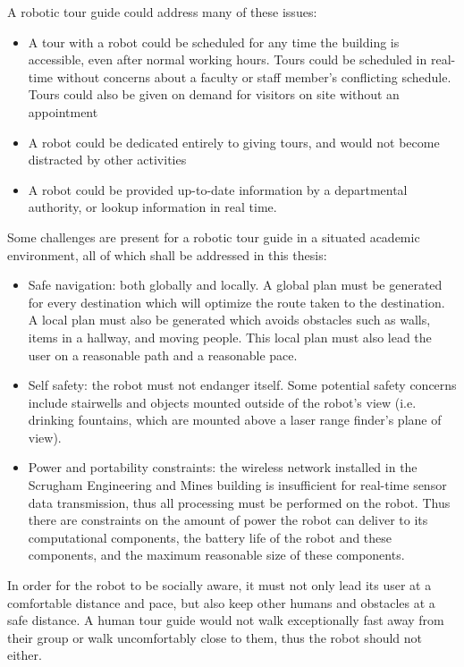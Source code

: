 \documentclass[11pt]{report}
\begin{document}
A robotic tour guide could address many of these issues:
\begin{itemize}
 \item A tour with a robot could be scheduled for any time the building is accessible, even after normal working hours. Tours could be scheduled in real-time without concerns about a faculty or staff member's conflicting schedule. Tours could also be given on demand for visitors on site without an appointment
 \item A robot could be dedicated entirely to giving tours, and would not become distracted by other activities
 \item A robot could be provided up-to-date information by a departmental authority, or lookup information in real time.
\end{itemize}

Some challenges are present for a robotic tour guide in a situated academic environment, all of which shall be addressed in this thesis:
\begin{itemize}
 \item Safe navigation: both globally and locally. A global plan must be generated for every destination which will optimize the route taken to the destination. A local plan must also be generated which avoids obstacles such as walls, items in a hallway, and moving people. This local plan must also lead the user on a reasonable path and a reasonable pace.
 \item Self safety: the robot must not endanger itself. Some potential safety concerns include stairwells and objects mounted outside of the robot's view (i.e. drinking fountains, which are mounted above a laser range finder's plane of view).
 \item Power and portability constraints: the wireless network installed in the Scrugham Engineering and Mines building is insufficient for real-time sensor data transmission, thus all processing must be performed on the robot. Thus there are constraints on the amount of power the robot can deliver to its computational components, the battery life of the robot and these components, and the maximum reasonable size of these components.
\end{itemize}


In order for the robot to be socially aware, it must not only lead its user at a comfortable distance and pace, but also keep other humans and obstacles at a safe distance. A human tour guide would not walk exceptionally fast away from their group or walk uncomfortably close to them, thus the robot should not either.
\end{document}
